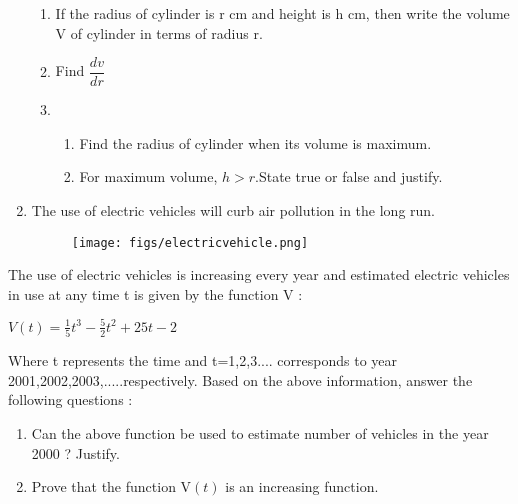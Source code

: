 \documentclass{article}
\providecommand{\brak}[1]{\ensuremath{\left(#1\right)}}
\begin{document}
\begin{enumerate}
 \begin{enumerate}[label=(\roman*)]

     \item  If the radius of cylinder is r cm and height is h cm, then write the volume V of cylinder in terms of radius r. 
     \item Find $\dfrac{dv}{dr}$ 
     
     \item 
	     \begin{enumerate}[label=(\alph*)]
     \item Find the radius of cylinder when its volume is maximum. 
   
     \item  For maximum volume, $h > r$.State true or false and justify. 
 \end{enumerate}
 \end{enumerate}
    
 \item The use of electric vehicles will curb air pollution in the long run.
 
\begin{figure}[!h]
	\begin{center}
\texttt{[image: figs/electricvehicle.png]}
	\end{center}
\caption{}
\label{fig:electricvehicle}
\end{figure}
\end{enumerate}
  
 The use of electric vehicles is increasing every year and estimated electric vehicles in use at any time t is given by the function V :
 
 
    $V\brak{t}=\frac{1}{5}t^3 - \frac{5}{2}t^2 + 25t-2$ 



 Where t represents the time and t=1,2,3.... corresponds to year 2001,2002,2003,.....respectively.\newline
 Based on the above information, answer the following questions :
 \begin{enumerate}[label=(\roman*)]
     \item Can the above function be used to estimate number of vehicles in the year 2000 ? Justify. 
     \item Prove that the function V\brak{t} is an increasing function.
 \end{enumerate}
 
 
   
  
  
\end{document}

